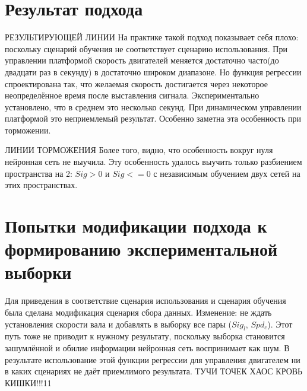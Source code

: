 \documentclass[14pt]{extreport}
\begin{document}
            \section{Результат подхода}

                { РЕЗУЛЬТИРУЮЩЕЙ ЛИНИИ}
                На практике такой подход показывает себя плохо: поскольку сценарий обучения не соответствует сценарию использования. При управлении платформой скорость двигателей меняется достаточно часто(до двадцати раз в секунду) в достаточно широком диапазоне. Но функция регрессии спроектирована так, что желаемая скорость достигается через некоторое неопределённое время после выставления сигнала. Экспериментально установлено, что в среднем это несколько секунд. При динамическом управлении платформой это неприемлемый результат. Особенно заметна эта особенность при торможении.

                { ЛИНИИ ТОРМОЖЕНИЯ}
                Более того, видно, что особенность вокруг нуля нейронная сеть не выучила. Эту особенность удалось выучить только разбиением пространства на 2: $Sig>0$ и $Sig<=0$ с независимым обучением двух сетей на этих пространствах.
            \section{Попытки модификации подхода к формированию экспериментальной выборки}
                Для приведения в соответствие сценария использования и сценария обучения была сделана модификация сценария сбора данных. Изменение: не ждать установления скорости вала и добавлять в выборку все пары ($Sig_l$, $Spd_c$). Этот путь тоже не приводит к нужному результату, поскольку выборка становится зашумлённой и обилие информации нейронная сеть воспринимает как шум. В результате использование этой функции регрессии для управления двигателем ни в каких сценариях не даёт приемлимого результата.
                { ТУЧИ ТОЧЕК ХАОС КРОВЬ КИШКИ!!!11}
\end{document}
